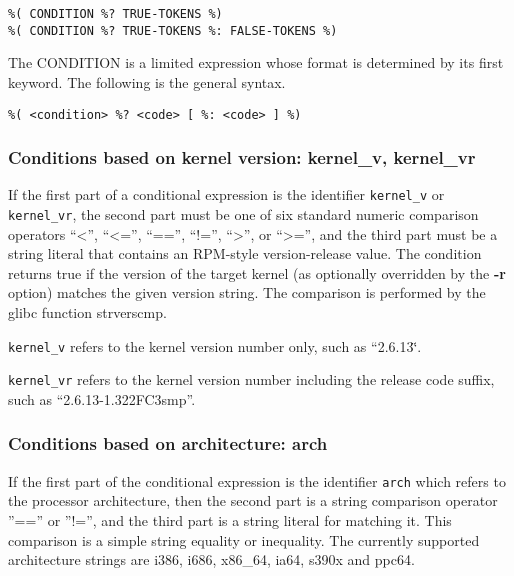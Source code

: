 \documentclass[twoside,english]{article}
\newenvironment{vindent}
{\begin{list}{}{\setlength{\listparindent}{6pt}}
\item[]}
{\end{list}}
\begin{document}
\begin{vindent}
\begin{verbatim}
%( CONDITION %? TRUE-TOKENS %)
%( CONDITION %? TRUE-TOKENS %: FALSE-TOKENS %)
\end{verbatim}
\end{vindent}
The CONDITION is a limited expression whose format is determined by its first
keyword. The following is the general syntax.

\begin{vindent}
\begin{verbatim}
%( <condition> %? <code> [ %: <code> ] %)
\end{verbatim}
\end{vindent}

\subsubsection{Conditions based on kernel version: kernel\_v, kernel\_vr}
If the first part of a conditional expression is the identifier \texttt{kernel\_v}
or \texttt{kernel\_vr}, the second part must be one of six standard numeric
comparison operators {}``\textless'', {}``\textless ='', {}``=='', {}``!='', {}``\textgreater'',
or {}``\textgreater ='',
and the third part must be a string literal that contains an RPM-style version-release
value. The condition returns true if the version of the target kernel (as
optionally overridden by the \textbf{-r} option) matches the given version
string. The comparison is performed by the glibc function strverscmp.

\texttt{kernel\_v} refers to the kernel version number only, such as {}``2.6.13\char`\"{}.

\texttt{kernel\_vr} refers to the kernel version number including the release
code suffix, such as {}``2.6.13-1.322FC3smp''.


\subsubsection{Conditions based on architecture: arch}
If the first part of the conditional expression is the identifier \texttt{arch}
which refers to the processor architecture, then the second part is a string
comparison operator ''=='' or ''!='', and the third part is a string
literal for matching it. This comparison is a simple string equality or inequality.
The currently supported architecture strings are i386, i686, x86\_64, ia64,
s390x and ppc64.
\end{document}
